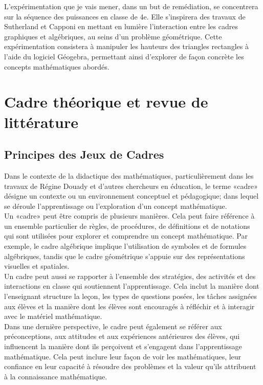 L'expérimentation que je vais mener,
dans un but de remédiation,
se concentrera sur la séquence des puissances en classe de 4e.
Elle s'inspirera des travaux de Sutherland et Capponi en mettant en lumière l'interaction entre les cadres graphiques et algébriques,
au seins d'un problème géométrique.
Cette expérimentation consistera à manipuler les hauteurs des triangles rectangles à l'aide du logiciel Géogebra,
permettant ainsi d'explorer de façon concrète les concepts mathématiques abordés.

\section{Cadre théorique et revue de littérature}
\subsection{Principes des Jeux de Cadres}

Dans le contexte de la didactique des mathématiques,
particulièrement dans les travaux de Régine Douady et d'autres chercheurs en éducation,
le terme «cadre» désigne un contexte ou un environnement conceptuel et pédagogique;
dans lequel se déroule l'apprentissage ou l'exploration d'un concept mathématique.\\

Un «cadre» peut être compris de plusieurs manières.
Cela peut faire référence à un ensemble particulier de règles,
de procédures,
de définitions et de notations qui sont utilisées pour explorer et comprendre un concept mathématique.
Par exemple,
le cadre algébrique implique l'utilisation de symboles et de formules algébriques,
tandis que le cadre géométrique s'appuie sur des représentations visuelles et spatiales.\\

Un cadre peut aussi se rapporter à l'ensemble des stratégies,
des activités et des interactions en classe qui soutiennent l'apprentissage.
Cela inclut la manière dont l'enseignant structure la leçon,
les types de questions posées,
les tâches assignées aux élèves et la manière dont les élèves sont encouragés à réfléchir et à interagir avec le matériel mathématique.\\

Dans une dernière perspective,
le cadre peut également se référer aux préconceptions,
aux attitudes et aux expériences antérieures des élèves,
qui influencent la manière dont ils perçoivent et s'engagent dans l'apprentissage mathématique.
Cela peut inclure leur façon de voir les mathématiques,
leur confiance en leur capacité à résoudre des problèmes et la valeur qu'ils attribuent à la connaissance mathématique.\\

